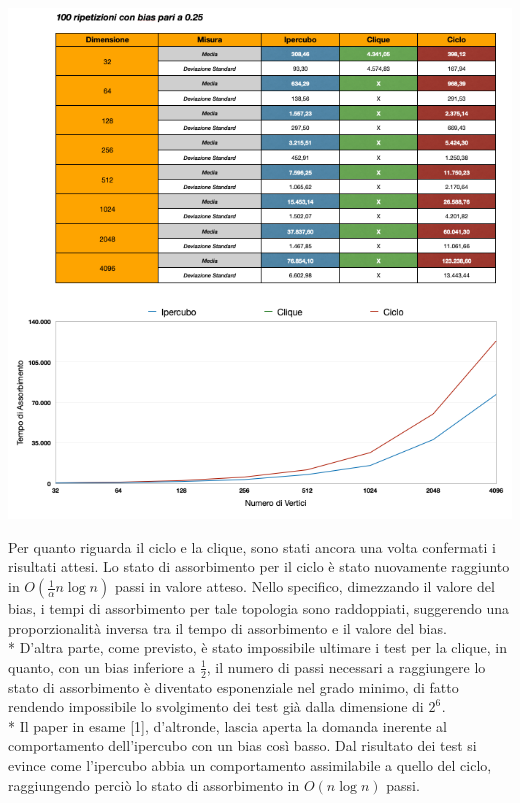 \documentclass{article}
\begin{document}
\begin{center}
\includegraphics[width=1\textwidth]{Test/test_bias025.png}
\end{center}
Per quanto riguarda il ciclo e la clique, sono stati ancora una volta confermati i risultati attesi.
Lo stato di assorbimento per il ciclo è stato nuovamente raggiunto in $O(\frac{1}{\alpha}n\log{}n)$ passi in valore atteso. Nello specifico, dimezzando il valore del bias, i tempi di assorbimento per tale topologia sono raddoppiati, suggerendo una proporzionalità inversa tra il tempo di assorbimento e il valore del bias.\\*
D'altra parte, come previsto, è stato impossibile ultimare i test per la clique, in quanto, con un bias inferiore a $\frac{1}{2}$, il numero di passi necessari a raggiungere lo stato di assorbimento è diventato esponenziale nel grado minimo, di fatto rendendo impossibile lo svolgimento dei test già dalla dimensione di $2^{6^{\mathrm{}}}$.\\*
Il paper in esame [1], d'altronde, lascia aperta la domanda inerente al comportamento dell'ipercubo con un bias così basso. Dal risultato dei test si evince come l'ipercubo abbia un comportamento assimilabile a quello del ciclo, raggiungendo perciò lo stato di assorbimento in $O(n\log{}n)$ passi.
\end{document}
